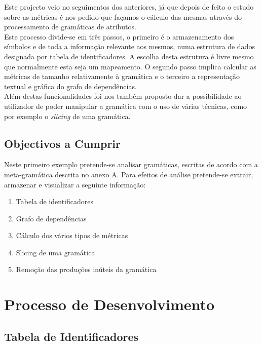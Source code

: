 \documentclass[a4paper,11pt]{article}
\begin{document}
Este projecto veio no seguimentos dos anteriores, já que depois de feito o estudo sobre as métricas é nos pedido que façamos o cálculo das mesmas através do processamento de gramáticas de atributos.\\
\newline
Este processo divide-se em três passos, o primeiro é o armazenamento dos símbolos e de toda a informação relevante aos mesmos, numa estrutura de dados designada por tabela de identificadores. A escolha desta estrutura é livre mesmo que normalmente esta seja um mapeamento. O segundo passo implica calcular as métricas de tamanho relativamente à gramática e o terceiro a representação textual e gráfica do grafo de dependências.\\
\newline
Além destas funcionalidades foi-nos também proposto dar a possibilidade ao utilizador de poder manipular a gramática com o uso de várias técnicas, como por exemplo o {\em slicing} de uma gramática.\\

\subsection{Objectivos a Cumprir}

Neste primeiro exemplo pretende-se analisar gramáticas, escritas de acordo com a meta-gramática descrita no anexo A. Para efeitos de análise pretende-se extrair, armazenar e visualizar a seguinte informação:

\begin{enumerate}
\item Tabela de identificadores
\item Grafo de dependências
\item Cálculo dos vários tipos de métricas
\item Slicing de uma gramática
\item Remoção das produções inúteis da gramática
\end{enumerate}


\newpage

\section{\LARGE Processo de Desenvolvimento}


\subsection{\large Tabela de Identificadores}
\end{document}
